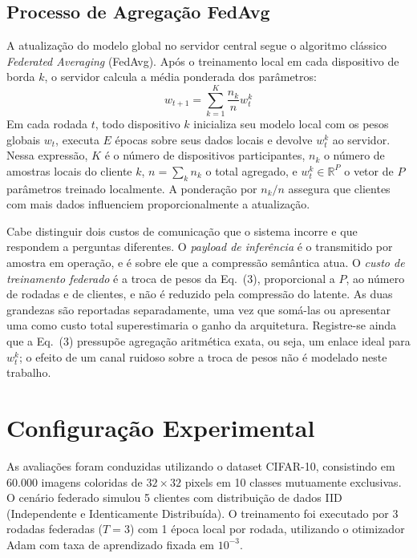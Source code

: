 \documentclass[conference]{IEEEtran}
\begin{document}
\subsection{Processo de Agregação FedAvg}
A atualização do modelo global no servidor central segue o algoritmo clássico \textit{Federated Averaging} (FedAvg). Após o treinamento local em cada dispositivo de borda $k$, o servidor calcula a média ponderada dos parâmetros:
\begin{equation}
    w_{t+1} = \sum_{k=1}^{K} \frac{n_k}{n} w_{t}^k
\end{equation}
Em cada rodada $t$, todo dispositivo $k$ inicializa seu modelo local com os pesos globais $w_t$, executa $E$ épocas sobre seus dados locais e devolve $w_t^k$ ao servidor. Nessa expressão, $K$ é o número de dispositivos participantes, $n_k$ o número de amostras locais do cliente $k$, $n = \sum_{k} n_k$ o total agregado, e $w_t^k \in \mathbb{R}^P$ o vetor de $P$ parâmetros treinado localmente. A ponderação por $n_k/n$ assegura que clientes com mais dados influenciem proporcionalmente a atualização.

Cabe distinguir dois custos de comunicação que o sistema incorre e que respondem a perguntas diferentes. O \emph{payload de inferência} é o transmitido por amostra em operação, e é sobre ele que a compressão semântica atua. O \emph{custo de treinamento federado} é a troca de pesos da Eq.~(3), proporcional a $P$, ao número de rodadas e de clientes, e não é reduzido pela compressão do latente. As duas grandezas são reportadas separadamente, uma vez que somá-las ou apresentar uma como custo total superestimaria o ganho da arquitetura. Registre-se ainda que a Eq.~(3) pressupõe agregação aritmética exata, ou seja, um enlace ideal para $w_t^k$; o efeito de um canal ruidoso sobre a troca de pesos não é modelado neste trabalho.

\section{Configuração Experimental}

As avaliações foram conduzidas utilizando o dataset CIFAR-10, consistindo em 60.000 imagens coloridas de $32 \times 32$ pixels em 10 classes mutuamente exclusivas. O cenário federado simulou 5 clientes com distribuição de dados IID (Independente e Identicamente Distribuída). O treinamento foi executado por 3 rodadas federadas ($T=3$) com 1 época local por rodada, utilizando o otimizador Adam com taxa de aprendizado fixada em $10^{-3}$.
\end{document}
